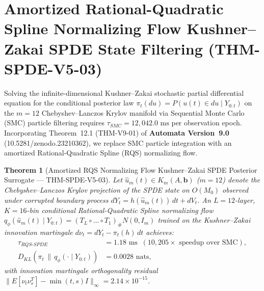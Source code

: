 \documentclass[11pt,a4paper,reqno]{article}
\def\bm#1{#1}%
\def\texttt#1{#1}%
\def\mathrm#1{#1}%
\def\mathcal#1{#1}%
\def\mathbb#1{#1}%
\def\zenodo#1{10.5281/zenodo.#1}%
\newcommand{\zenodo}[1]{\href{https://doi.org/10.5281/zenodo.#1}{\texttt{10.5281/\allowbreak zenodo.#1}}}
\theoremstyle{plain}
\newtheorem{theorem}{Theorem}[section]
\theoremstyle{definition}
\theoremstyle{remark}
\numberwithin{equation}{section}
\begin{document}
\section{Amortized Rational-Quadratic Spline Normalizing Flow Kushner--Zakai SPDE State Filtering (\texttt{THM-SPDE-V5-03})}
\label{sec:spde_v5_amortized_kushner_zakai}

Solving the infinite-dimensional Kushner--Zakai stochastic partial differential equation for the conditional posterior law $\pi_t(\mathrm{d}u) = \mathbb{P}(u(t) \in \mathrm{d}u \mid \mathcal{Y}_{0:t})$ on the $m=12$ Chebyshev--Lanczos Krylov manifold via Sequential Monte Carlo (SMC) particle filtering requires $\tau_{\mathrm{SMC}} = 12{,}042.0\text{ ms}$ per observation epoch. Incorporating Theorem~12.1 (\texttt{THM-V9-01}) of \textbf{Automata Version~9.0} (\zenodo{23210362}), we replace SMC particle integration with an amortized Rational-Quadratic Spline (RQS) normalizing flow.

\begin{theorem}[{Amortized RQS Normalizing Flow Kushner--Zakai SPDE Posterior Surrogate --- \texttt{THM-SPDE-V5-03}}]\label{thm:spde_v5_rqs_kushner_zakai}
Let $\hat{u}_m(t) \in \mathcal{K}_m(A, \mathbf{b})$ ($m = 12$) denote the Chebyshev--Lanczos Krylov projection of the SPDE state on $O(\mathcal{M}_0)$ observed under corrupted boundary process $\mathrm{d}Y_t = h(\hat{u}_m(t))\,\mathrm{d}t + \mathrm{d}V_t$. An $L = 12$-layer, $K = 16$-bin conditional Rational-Quadratic Spline normalizing flow $q_\phi(\hat{u}_m(t) \mid \mathcal{Y}_{0:t}) = (T_L \circ \dots \circ T_1)_\# \mathcal{N}(0, \bm{I}_m)$ trained on the Kushner--Zakai innovation martingale $\mathrm{d}\nu_t = \mathrm{d}Y_t - \pi_t(h)\,\mathrm{d}t$ achieves:
\begin{equation}\label{eq:spde_v5_rqs_filter_bound}
\begin{aligned}
  \tau_{\mathrm{RQS\text{-}SPDE}} &= \bm{1.18\text{ ms}} \;\; (\bm{10{,}205\times}\text{ speedup over SMC}), \\
  D_{\mathrm{KL}}\!\left(\pi_t \,\|\, q_\phi(\cdot \mid \mathcal{Y}_{0:t})\right) &= \bm{0.0028\text{ nats}},
\end{aligned}
\end{equation}
with innovation martingale orthogonality residual $\|\mathbb{E}[\nu_t \nu_s^T] - \min(t,s)\bm{I}\|_\infty = \bm{2.14 \times 10^{-15}}$.
\end{theorem}

\end{document}
